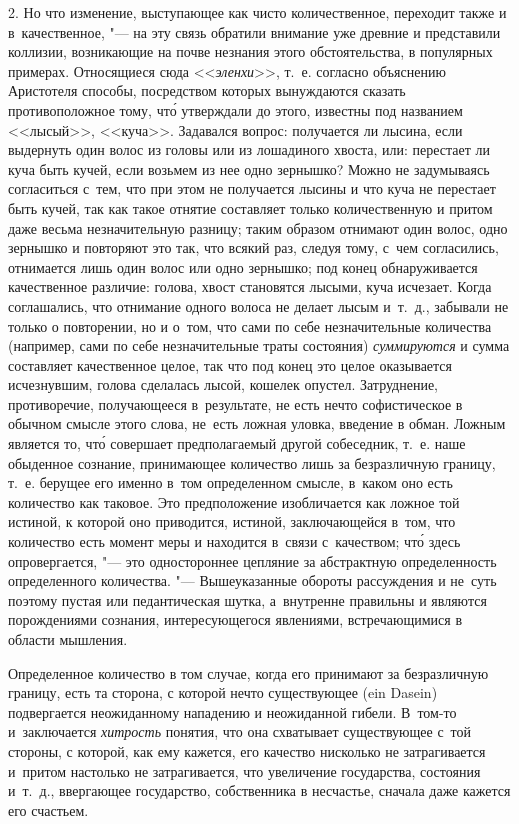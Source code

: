2. Но что изменение, выступающее как чисто количественное, переходит также и
в~качественное, "--- на эту связь обратили внимание уже древние и представили
коллизии, возникающие на почве незнания этого обстоятельства, в популярных
примерах. Относящиеся сюда <<{\em эленхи}>>, т.~е. согласно объяснению
Аристотеля способы, посредством которых вынуждаются сказать противоположное
тому, чт\'{о} утверждали до этого, известны под названием <<лысый>>, <<куча>>.
Задавался вопрос: получается ли лысина, если выдернуть один волос из головы или
из лошадиного хвоста, или: перестает ли куча быть кучей, если возьмем из нее
одно зернышко? Можно не задумываясь согласиться с~тем, что при этом не
получается лысины и что куча не перестает быть кучей, так как такое отнятие
составляет только количественную и притом даже весьма незначительную разницу;
таким образом отнимают один волос, одно зернышко и повторяют это так, что
всякий раз, следуя тому, с~чем согласились, отнимается лишь один волос или одно
зернышко; под конец обнаруживается качественное различие: голова, хвост
становятся лысыми, куча исчезает. Когда соглашались, что отнимание одного
волоса не делает лысым и~т.~д., забывали не только о повторении, но и о~том,
что сами по себе незначительные количества (например, сами по себе
незначительные траты состояния) {\em суммируются} и сумма составляет
качественное целое, так что под конец это целое оказывается исчезнувшим, голова
сделалась лысой, кошелек опустел. Затруднение, противоречие, получающееся
в~результате, не есть нечто софистическое в обычном смысле этого слова, не~есть
ложная уловка, введение в обман. Ложным является то, чт\'{о} совершает
предполагаемый другой собеседник, т.~е. наше обыденное сознание, принимающее
количество лишь за безразличную границу, т.~е. берущее его именно в~том
определенном смысле, в~каком оно есть количество как таковое. Это предположение
изобличается как ложное той истиной, к которой оно приводится, истиной,
заключающейся в~том, что количество есть момент меры и находится в~связи
с~качеством; чт\'{о} здесь опровергается, "--- это одностороннее цепляние за
абстрактную определенность определенного количества. "--- Вышеуказанные
обороты рассуждения и не~суть поэтому пустая или педантическая шутка,
а~внутренне правильны и являются порождениями сознания, интересующегося
явлениями, встречающимися в области мышления.

Определенное количество в том случае, когда его принимают за безразличную
границу, есть та сторона, с которой нечто существующее (ein Dasein)
подвергается неожиданному нападению и неожиданной гибели. В~том-то
и~заключается {\em хитрость} понятия, что она схватывает существующее с~той
стороны, с которой, как ему кажется, его качество нисколько не затрагивается
и~притом настолько не затрагивается, что увеличение государства, состояния
и~т.~д., ввергающее государство, собственника в несчастье, сначала даже кажется
его счастьем.

